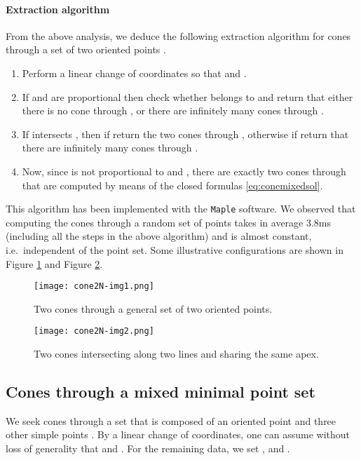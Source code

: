 \documentclass[5p]{elsarticle}
\newcommand{\com}[1]{{\color{black} #1}}
\newcommand{\lb}[1]{{\color{black} #1}}
\begin{document}
 
\paragraph{Extraction algorithm}

From the above analysis, we deduce the following extraction algorithm \lb{for cones} through a set of two oriented points .
\begin{enumerate}
	\item Perform a linear change of coordinates \lb{so that}  and . 
	\item If  and  are proportional then check \lb{whether}  belongs to  and return that either there is no cone through , or there are infinitely many cones through .
	\item If  \lb{intersects} , then if  return the two cones through , otherwise if  return that there are infinitely many cones through . 
	\item Now, since  is not proportional to  and , there are exactly two cones through  that are computed by means of the closed formulas \eqref{eq:conemixedsol}. 
\end{enumerate} 

This algorithm has been implemented with the {\tt Maple} software. We observed that \com{computing} the \com{cones} through a random set of points takes in average 3.8ms \com{(including all the steps in the above algorithm)} and is almost constant, \com{i.e.~independent} of the point set. Some illustrative configurations are shown in Figure \ref{fig:cone2N-1} and Figure \ref{fig:cone2N-2}.

 \begin{figure}
 	\centering
	\texttt{[image: cone2N-img1.png]}
    \caption{Two cones through a general set of two oriented points.}\label{fig:cone2N-1}
 \end{figure}

  \begin{figure}
 	 \centering
	 	 	     \texttt{[image: cone2N-img2.png]}
    \caption{Two cones intersecting along two lines and sharing the same apex.}\label{fig:cone2N-2}
 \end{figure}

\subsection{Cones through a mixed minimal point set}
 \com{We seek} cones through a set  \com{that} is composed of an oriented point  and three other simple points . By a linear change of coordinates, one can assume without loss of generality that  and  . For the remaining data, we set  ,  and .
 
\end{document}
